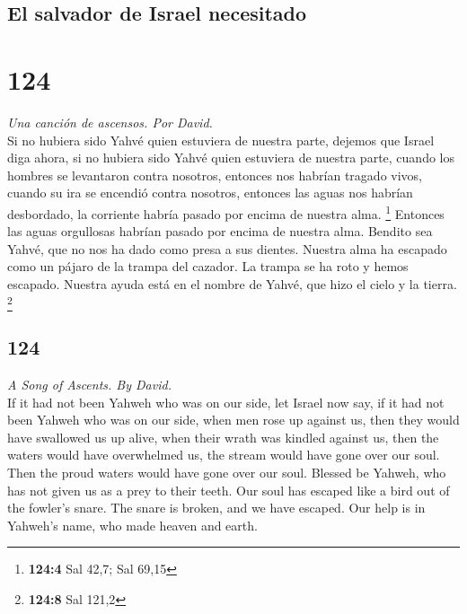 \begin{paracol}{2}
{\subsection{El salvador de Israel
necesitado}\label{el-salvador-de-israel-necesitado}}

\hypertarget{section-246}{%
\section{124}\label{section-246}}

\emph{Una canción de ascensos. Por David.}\\
 Si no hubiera sido Yahvé quien estuviera de nuestra
parte, dejemos que Israel diga ahora,  si no hubiera sido
Yahvé quien estuviera de nuestra parte, cuando los hombres se levantaron
contra nosotros,  entonces nos habrían tragado vivos,
cuando su ira se encendió contra nosotros,  entonces las
aguas nos habrían desbordado, la corriente habría pasado por encima de
nuestra alma. \footnote{\textbf{124:4} Sal 42,7; Sal 69,15}
 Entonces las aguas orgullosas habrían pasado por encima
de nuestra alma.  Bendito sea Yahvé, que no nos ha dado
como presa a sus dientes.  Nuestra alma ha escapado como
un pájaro de la trampa del cazador. La trampa se ha roto y hemos
escapado.  Nuestra ayuda está en el nombre de Yahvé, que
hizo el cielo y la tierra. \footnote{\textbf{124:8} Sal 121,2}

\switchcolumn
\begin{otherlanguage}{english}

\hypertarget{section-247}{%
\section{124}\label{section-247}}

\emph{A Song of Ascents. By David.}\\
 If it had not been Yahweh who was on our side, let Israel
now say,  if it had not been Yahweh who was on our side,
when men rose up against us,  then they would have
swallowed us up alive, when their wrath was kindled against us,
 then the waters would have overwhelmed us, the stream
would have gone over our soul.  Then the proud waters
would have gone over our soul.  Blessed be Yahweh, who has
not given us as a prey to their teeth.  Our soul has
escaped like a bird out of the fowler's snare. The snare is broken, and
we have escaped.  Our help is in Yahweh's name, who made
heaven and earth.


\end{otherlanguage}
\end{paracol}
